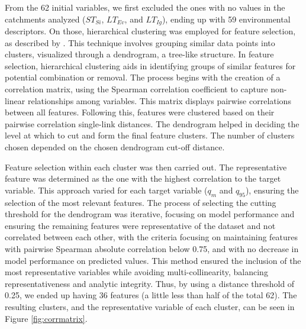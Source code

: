 \documentclass[12pt]{article}
\begin{document}
\par From the 62 initial variables, we first excluded the ones with no values in the catchments analyzed ($ST_{Si}$, $LT_{Ev}$, and $LT_{Ig}$), ending up with 59 environmental descriptors. On those, hierarchical clustering was employed for feature selection, as described by \cite{johnson1967}. This technique involves grouping similar data points into clusters, visualized through a dendrogram, a tree-like structure. In feature selection, hierarchical clustering aids in identifying groups of similar features for potential combination or removal. The process begins with the creation of a correlation matrix, using the Spearman correlation coefficient to capture non-linear relationships among variables. This matrix displays pairwise correlations between all features. Following this, features were clustered based on their pairwise correlation single-link distances. The dendrogram helped in deciding the level at which to cut and form the final feature clusters. The number of clusters chosen depended on the chosen dendrogram cut-off distance.

\par Feature selection within each cluster was then carried out. The representative feature was determined as the one with the highest correlation to the target variable. This approach varied for each target variable (\( q_{m} \) and \( q_{95} \)), ensuring the selection of the most relevant features. The process of selecting the cutting threshold for the dendrogram was iterative, focusing on model performance and ensuring the remaining features were representative of the dataset and not correlated between each other, with the criteria focusing on maintaining features with pairwise Spearman absolute correlation below 0.75, and with no decrease in model performance on predicted values. This method ensured the inclusion of the most representative variables while avoiding multi-collinearity, balancing representativeness and analytic integrity. Thus, by using a distance threshold of 0.25, we ended up having 36 features (a little less than half of the total 62). The resulting clusters, and the representative variable of each cluster, can be seen in Figure \ref{fig:corrmatrix}.
\end{document}

